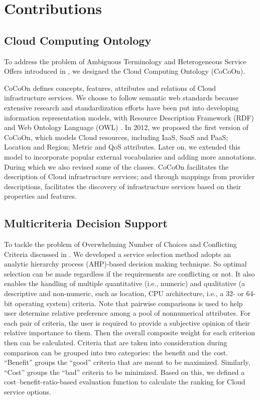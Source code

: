 \section{Contributions}
\subsection{Cloud Computing Ontology}
\label{sec:CloudComputingOntology}
To address the problem of Ambiguous Terminology and Heterogeneous Service Offers introduced in , we designed the Cloud Computing Ontology (CoCoOn).

CoCoOn defines concepts, features, attributes and relations of Cloud infrastructure services. 
We choose to follow semantic web standards because extensive research
and standardization efforts \cite{DBLP:journals/ao/RomanKLBLSPFBF05,DBLP:conf/www/MartinBMMPSMSS07, DBLP:conf/icws/HallerCMOB05, 5493487, Moscato2011AnAO} have been put into developing
information representation models, with Resource
Description Framework (RDF) \cite{RDF} and Web Ontology Language (OWL) \cite{OWL}. 
In 2012, we proposed the first version of CoCoOn, which models Cloud resources, including
IaaS, SaaS and PaaS; Location and Region; Metric and QoS attributes.
Later on, we extended this model to incorporate popular external vocabularies and adding more annotations.
During which we also revised some of the classes.
CoCoOn facilitates the description of Cloud infrastructure services; 
and through mappings from provider descriptions, facilitates the
discovery of infrastructure services based on their properties and features.

\subsection{Multicriteria Decision Support}
To tackle the problem of Overwhelming Number of Choices and Conflicting Criteria discussed in .
We developed a service selection method adopts an analytic hierarchy process (AHP)-based decision making technique. So optimal selection can be made regardless if the requirements are conflicting or not.
It also enables the handling of multiple quantitative (i.e., numeric) and qualitative (a descriptive and
non-numeric, such as location, CPU architecture, i.e., a 32- or
64-bit operating system) criteria. 
Note that pairwise comparisons \cite{PairwiseComparison} is used to help user determine relative preference among a pool of nonnumerical attributes.
For each pair of criteria, the user is required to provide a subjective
opinion of their relative importance to them.
Then the overall composite weight for each criterion then can be calculated.
Criteria that are taken into consideration during comparison can be grouped into two
categories: the benefit and the cost. “Benefit” groups the “good” criteria
that are meant to be maximized. Similarly, “Cost” groups the “bad” criteria to
be minimized. Based on this, we defined a cost–benefit-ratio-based evaluation function to 
calculate the ranking for Cloud service options.


